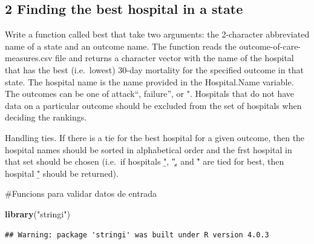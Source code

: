 \documentclass[
]{article}
\newenvironment{Shaded}{\begin{snugshade}}{\end{snugshade}}
\newcommand{\KeywordTok}[1]{\textcolor[rgb]{0.13,0.29,0.53}{\textbf{#1}}}
\newcommand{\NormalTok}[1]{#1}
\newcommand{\StringTok}[1]{\textcolor[rgb]{0.31,0.60,0.02}{#1}}
\begin{document}
\hypertarget{finding-the-best-hospital-in-a-state}{%
\subsection{2 Finding the best hospital in a
state}\label{finding-the-best-hospital-in-a-state}}

Write a function called best that take two arguments: the 2-character
abbreviated name of a state and an outcome name. The function reads the
outcome-of-care-measures.csv file and returns a character vector with
the name of the hospital that has the best (i.e.~lowest) 30-day
mortality for the specified outcome in that state. The hospital name is
the name provided in the Hospital.Name variable. The outcomes can be one
of \heart attack``, \heart failure'', or \pneumonia". Hospitals that do
not have data on a particular outcome should be excluded from the set of
hospitals when deciding the rankings.

Handling ties. If there is a tie for the best hospital for a given
outcome, then the hospital names should be sorted in alphabetical order
and the frst hospital in that set should be chosen (i.e.~if hospitals
\b", \c", and \f" are tied for best, then hospital \b" should be
returned).

\#Funcions para validar datos de entrada

\begin{Shaded}
\begin{Highlighting}[]
\KeywordTok{library}\NormalTok{(}\StringTok{"stringi"}\NormalTok{)}
\end{Highlighting}
\end{Shaded}

\begin{verbatim}
## Warning: package 'stringi' was built under R version 4.0.3
\end{verbatim}
\end{document}
